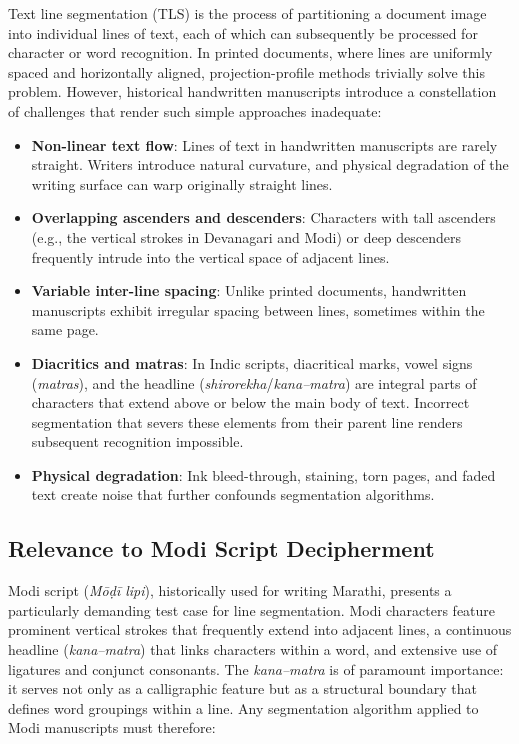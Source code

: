 \documentclass[11pt, a4paper]{article}
\begin{document}
Text line segmentation (TLS) is the process of partitioning a document image into individual lines of text, each of which can subsequently be processed for character or word recognition. In printed documents, where lines are uniformly spaced and horizontally aligned, projection-profile methods trivially solve this problem. However, historical handwritten manuscripts introduce a constellation of challenges that render such simple approaches inadequate:

\begin{itemize}[leftmargin=1.5em]
    \item \textbf{Non-linear text flow}: Lines of text in handwritten manuscripts are rarely straight. Writers introduce natural curvature, and physical degradation of the writing surface can warp originally straight lines.
    \item \textbf{Overlapping ascenders and descenders}: Characters with tall ascenders (e.g., the vertical strokes in Devanagari and Modi) or deep descenders frequently intrude into the vertical space of adjacent lines.
    \item \textbf{Variable inter-line spacing}: Unlike printed documents, handwritten manuscripts exhibit irregular spacing between lines, sometimes within the same page.
    \item \textbf{Diacritics and matras}: In Indic scripts, diacritical marks, vowel signs (\textit{matras}), and the headline (\textit{shirorekha}/\textit{kana--matra}) are integral parts of characters that extend above or below the main body of text. Incorrect segmentation that severs these elements from their parent line renders subsequent recognition impossible.
    \item \textbf{Physical degradation}: Ink bleed-through, staining, torn pages, and faded text create noise that further confounds segmentation algorithms.
\end{itemize}

\subsection{Relevance to Modi Script Decipherment}

Modi script (\textit{M\={o}\d{d}\={i} lipi}), historically used for writing Marathi, presents a particularly demanding test case for line segmentation. Modi characters feature prominent vertical strokes that frequently extend into adjacent lines, a continuous headline (\textit{kana--matra}) that links characters within a word, and extensive use of ligatures and conjunct consonants. The \textit{kana--matra} is of paramount importance: it serves not only as a calligraphic feature but as a structural boundary that defines word groupings within a line. Any segmentation algorithm applied to Modi manuscripts must therefore:
\end{document}

